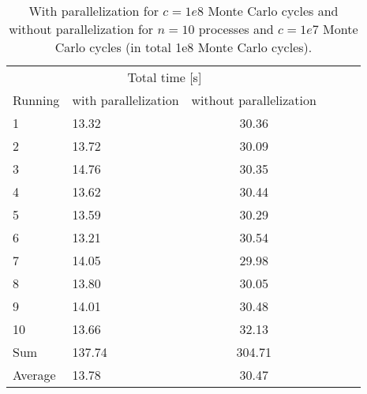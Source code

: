 \documentclass[norsk,a4paper,12pt]{article}
\begin{document}
\begin{table}[H]
\centering
\caption{With parallelization for $c=1e8$ Monte Carlo cycles and without parallelization for $n=10$ processes and $c=1e7$ Monte Carlo cycles (in total 1e8 Monte Carlo cycles).}
\label{tab:timeParallelize} 
\begin{tabularx}{\textwidth}{XlcXrX}
\toprule
\multicolumn{3}{c}{Total time [s]}\\
\cline{2-3}
Running  & with parallelization  & without parallelization \\
\midrule
1	& 13.32  & 30.36    \\
2   & 13.72  & 30.09    \\
3   & 14.76  & 30.35    \\
4   & 13.62  & 30.44    \\
5   & 13.59  & 30.29    \\
6 	& 13.21  & 30.54    \\
7 	& 14.05  & 29.98    \\
8   & 13.80  & 30.05    \\
9   & 14.01  & 30.48    \\
10  & 13.66  & 32.13    \\
\midrule
Sum & 137.74 & 304.71 \\
Average & 13.78 & 30.47 \\
\bottomrule
\end{tabularx}
\end{table}
\end{document}
